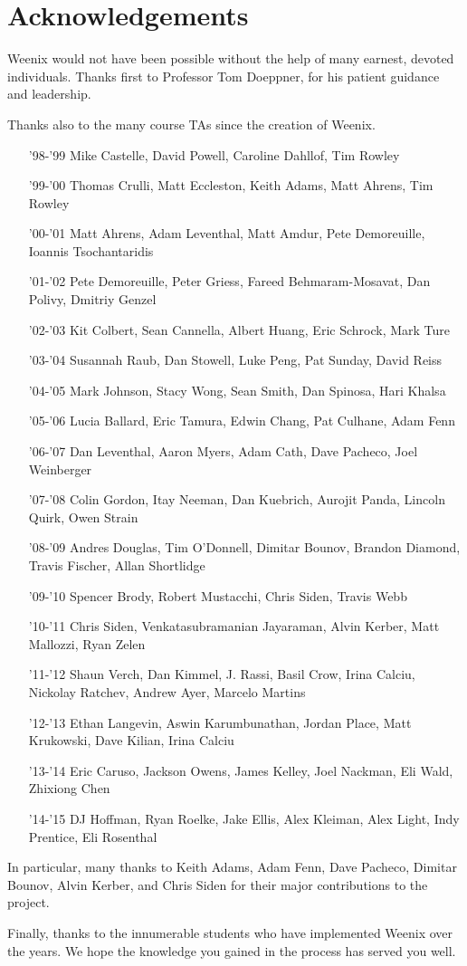\section{Acknowledgements}
Weenix would not have been possible without the help of many earnest, devoted individuals. Thanks first to Professor Tom Doeppner, for his patient guidance and leadership.

Thanks also to the many course TAs since the creation of Weenix.
\begin{itemize}
    \item['98-'99] Mike Castelle, David Powell, Caroline Dahllof, Tim Rowley
    \item['99-'00] Thomas Crulli, Matt Eccleston, Keith Adams, Matt Ahrens, Tim Rowley
    \item['00-'01] Matt Ahrens, Adam Leventhal, Matt Amdur, Pete Demoreuille, Ioannis Tsochantaridis
    \item['01-'02] Pete Demoreuille, Peter Griess, Fareed Behmaram-Mosavat, Dan Polivy, Dmitriy Genzel
    \item['02-'03] Kit Colbert, Sean Cannella, Albert Huang, Eric Schrock, Mark Ture
    \item['03-'04] Susannah Raub, Dan Stowell, Luke Peng, Pat Sunday, David Reiss
    \item['04-'05] Mark Johnson, Stacy Wong, Sean Smith, Dan Spinosa, Hari Khalsa
    \item['05-'06] Lucia Ballard, Eric Tamura, Edwin Chang, Pat Culhane, Adam Fenn
    \item['06-'07] Dan Leventhal, Aaron Myers, Adam Cath, Dave Pacheco, Joel Weinberger
    \item['07-'08] Colin Gordon, Itay Neeman, Dan Kuebrich, Aurojit Panda, Lincoln Quirk, Owen Strain
    \item['08-'09] Andres Douglas, Tim O'Donnell, Dimitar Bounov, Brandon Diamond, Travis Fischer, Allan Shortlidge
    \item['09-'10] Spencer Brody, Robert Mustacchi, Chris Siden, Travis Webb
    \item['10-'11] Chris Siden, Venkatasubramanian Jayaraman, Alvin Kerber, Matt Mallozzi, Ryan Zelen
    \item['11-'12] Shaun Verch, Dan Kimmel, J. Rassi, Basil Crow, Irina	Calciu, Nickolay Ratchev, Andrew Ayer, Marcelo Martins
    \item['12-'13] Ethan Langevin, Aswin Karumbunathan, Jordan Place, Matt Krukowski, Dave Kilian, Irina Calciu
    \item['13-'14] Eric Caruso, Jackson Owens, James Kelley, Joel Nackman, Eli Wald, Zhixiong Chen
    \item['14-'15] DJ Hoffman, Ryan Roelke, Jake Ellis, Alex Kleiman, Alex Light, Indy Prentice, Eli Rosenthal
\end{itemize}
In particular, many thanks to Keith Adams, Adam Fenn, Dave Pacheco, Dimitar Bounov, Alvin Kerber, and Chris Siden for their major contributions to the project.

Finally, thanks to the innumerable students who have implemented Weenix over the years. We hope the knowledge you gained in the process has served you well.

